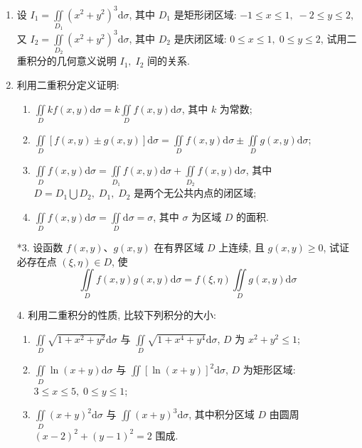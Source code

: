 \begin{enumerate}\setlength{\itemsep}{7pt}
    \item 设 $\displaystyle I_1=\iint\limits_{D_1}(x^2+y^2)^3\text{d}\sigma$, 其中 $D_1$ 是矩形闭区域: $-1\leqslant x\leqslant 1,\;-2\leqslant y\leqslant 2$, 又 $I_2=\iint\limits_{D_2}(x^2+y^2)^3\text{d}\sigma$, 其中 $D_2$ 是庆闭区域: $0\leqslant x\leqslant 1,\;0\leqslant y\leqslant 2$, 试用二重积分的几何意义说明 $I_1,\;I_2$ 间的关系.
    
    \item 利用二重积分定义证明:
    \begin{enumerate}[(1)]\setlength{\itemsep}{5pt}\setlength{\topsep}{15pt}
        \item $\displaystyle\iint\limits_{D}kf(x, y)\text{d}\sigma=k\iint\limits_{D}f(x, y)\text{d}\sigma$, 其中 $k$ 为常数;
        \item $\displaystyle\iint\limits_{D}[f(x, y)\pm g(x, y)]\text{d}\sigma=\iint\limits_{D}f(x, y)\text{d}\sigma \pm\iint\limits_{D}g(x, y)\text{d}\sigma$;
        \item $\displaystyle\iint\limits_{D}f(x, y)\text{d}\sigma=\iint\limits_{D_1}f(x, y)\text{d}\sigma+\iint\limits_{D_2}f(x, y)\text{d}\sigma$, 其中 $D=D_1\bigcup D_2,\;D_1,\;D_2$ 是两个无公共内点的闭区域;
        \item $\displaystyle\iint\limits_{D}f(x, y)\text{d}\sigma=\iint\limits_{D}\text{d}\sigma=\sigma$, 其中 $\sigma$ 为区域 $D$ 的面积.
    \end{enumerate}

    \item[*3.] 设函数 $f(x, y)$、$g(x, y)$ 在有界区域 $D$ 上连续, 且 $g(x, y)\geqslant 0$, 试证必存在点 $(\xi, \eta)\in D$, 使
    \[
        \iint\limits_{D}f(x, y)g(x, y)\text{d}\sigma=f(\xi, \eta)\iint\limits_{D}g(x, y)\text{d}\sigma
    \]

    \item[4.] 利用二重积分的性质, 比较下列积分的大小:  
    \begin{enumerate}[(1)]\setlength{\itemsep}{5pt}\setlength{\topsep}{15pt}
        \item $\displaystyle\iint\limits_{D}\sqrt{1+x^2+y^2}\text{d}\sigma$ 与 $\displaystyle\iint\limits_{D}\sqrt{1+x^4+y^4}\text{d}\sigma$, $D$ 为 $x^2+y^2\leqslant 1$;
        \item $\displaystyle\iint\limits_{D}\ln(x+y)\text{d}\sigma$ 与 $\displaystyle\iint[\ln(x+y)]^2\text{d}\sigma$, $D$ 为矩形区域: $3\leqslant x\leqslant 5,\;0\leqslant y\leqslant 1$;
        \item $\displaystyle\iint\limits_{D}(x+y)^2\text{d}\sigma$ 与 $\displaystyle\iint(x+y)^3\text{d}\sigma$, 其中积分区域 $D$ 由圆周 $(x-2)^2+(y-1)^2=2$ 围成.
    \end{enumerate}


\end{enumerate}
